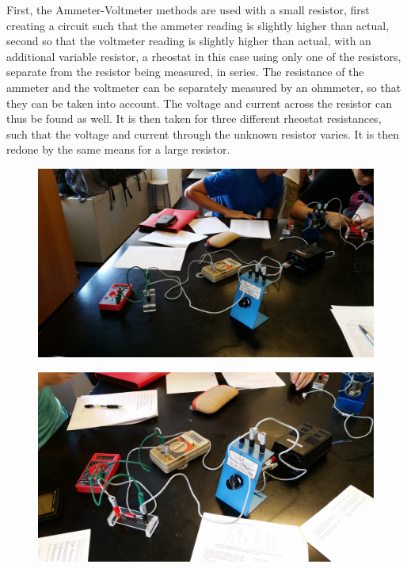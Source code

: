 \documentclass[11pt, titlepage]{article}
\begin{document}
First, the Ammeter-Voltmeter methods are used with a small resistor, first creating a circuit such that the ammeter reading is slightly higher than actual, second so that the voltmeter reading is slightly higher than actual, with an additional variable resistor, a rheostat in this case using only one of the resistors, separate from the resistor being measured, in series. The resistance of the ammeter and the voltmeter can be separately measured by an ohmmeter, so that they can be taken into account. The voltage and current across the resistor can thus be found as well. It is then taken for three different rheostat resistances, such that the voltage and current through the unknown resistor varies. It is then redone by the same means for a large resistor.

\begin{figure}[h]
\centering
\hspace*{0cm}
\includegraphics[scale=0.12, angle=90]{lab11.jpg}
\vspace*{0cm}
\end{figure}

\begin{figure}[h]
\centering
\hspace*{0cm}
\includegraphics[scale=0.12, angle=270]{lab12.jpg}
\vspace*{0cm}
\end{figure}
\end{document}
